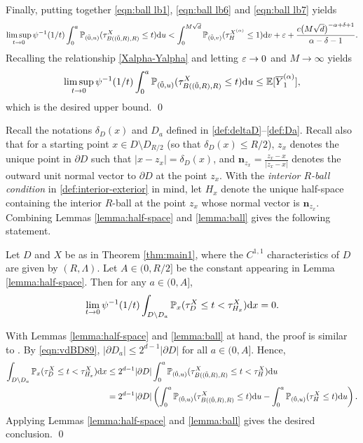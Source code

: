 \documentclass[11pt]{article}
\begin{document}
\begin{doublespace}
Finally, putting together \eqref{eqn:ball lb1}, \eqref{eqn:ball lb6} and \eqref{eqn:ball lb7} yields
\begin{align*}
\limsup_{t\to0}\psi^{-1}(1/t)\int_{0}^{a}{\mathbb P}_{(\tilde{0},u)}(\tau^{X}_{B((\tilde{0},R),R)}\leq t)\mathrm{d} u
<\int_{0}^{M\sqrt{d}}{\mathbb P}_{(\tilde{0},v)}(\tau_{H}^{X^{(\alpha)}}\leq 1)\mathrm{d} v+\varepsilon+\frac{c\bigl(M\sqrt{d}\bigr)^{-\alpha+\delta+1}}{\alpha-\delta-1}.
\end{align*}
Recalling the relationship \eqref{Xalpha-Yalpha} and letting $\varepsilon\to 0$ and $M\to \infty$ yields
\[
\limsup_{t\to 0}\psi^{-1}(1/t)\int_{0}^{a}{\mathbb P}_{(\tilde{0},u)}(\tau^{X}_{B((\tilde{0},R),R)}\le t)\mathrm{d} u\leq {\mathbb E}[\overline{Y}^{(\alpha)}_{1}],
\]
which is the desired upper bound.
\qed

Recall the notations $\delta_D(x)$ and $D_a$ defined in \eqref{def:deltaD}--\eqref{def:Da}. Recall also that for a starting point $x\in D\setminus D_{R/2}$ (so that $\delta_D(x)\le R/2$), $z_x$ denotes the unique point in $\partial D$ such that $|x-z_x|=\delta_{D}(x)$, and $\mathbf{n}_{z_{x}}=\frac{z_{x}-x}{|z_x-x|}$ denotes the outward unit normal vector to $\partial D$ at the point $z_x$. 
With the \textit{interior $R$-ball condition} in \eqref{def:interior-exterior} in mind,
let $H_{x}$ denote the unique half-space containing the interior $R$-ball at the point $z_x$ whose normal vector is $\textbf{n}_{z_{x}}$.
Combining Lemmas \ref{lemma:half-space} and \ref{lemma:ball} gives the following statement.

\begin{lemma}\label{lemma:cancellation}
Let $D$ and $X$ be as in Theorem \ref{thm:main1}, where the $C^{1,1}$ characteristics of $D$ are given by $(R,\Lambda)$. 
Let $A\in(0,R/2]$ be the constant appearing in Lemma \ref{lemma:half-space}.
Then for any $a\in(0, A ]$,
\[
\lim_{t\to0}\psi^{-1}(1/t)\int_{D\setminus D_{a}}{\mathbb P}_{x}(\tau^{X}_{D}\leq t<\tau^{X}_{H_x})\mathrm{d} x=0.
\]
\end{lemma}
\pf
With Lemmas \ref{lemma:half-space} and \ref{lemma:ball} at hand, the proof is similar to \cite[Lemma 3.4]{PS22}.
By \eqref{eqn:vdBD89},
$|\partial D_{a}|\leq 2^{d-1}|\partial D|$ for all $a\in(0,A]$. 
Hence,  
\begin{align*}
\int_{D\setminus D_{a}}{\mathbb P}_{x}(\tau^{X}_{D}\leq t<\tau^{X}_{H_x})\mathrm{d} x
&\leq 2^{d-1}|\partial D|\int_{0}^{a}{\mathbb P}_{(\tilde{0}, u)}(\tau^{X}_{B((\tilde{0},R),R)}  \leq t<\tau^{X}_{H}   )\mathrm{d} u\\
&=2^{d-1}|\partial D|\left( \int_{0}^{a}{\mathbb P}_{(\tilde{0}, u)}( \tau^{X}_{B((\tilde{0},R),R)} \leq t)\mathrm{d} u-\int_{0}^{a}{\mathbb P}_{(\tilde{0}, u)}( \tau^{X}_{H} \leq t)\mathrm{d} u\right).
\end{align*}
Applying Lemmas \ref{lemma:half-space} and \ref{lemma:ball} gives the desired conclusion.  
\qed


\end{doublespace}
\end{document}
